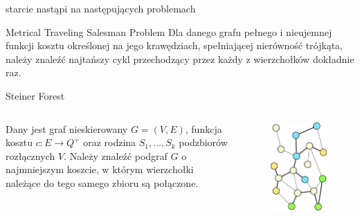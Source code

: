 \documentclass[final,hyperref={pdfpagelabels=false}]{beamer}
\begin{document}
\begin{frame}
  \begin{columns}		
    \begin{column}{.96\textwidth}
      \vspace{1cm}
      \begin{center}
        \veryHuge starcie nastąpi na następujących problemach
      \end{center}
      \vspace{1cm}

      \begin{block}{Metrical Traveling Salesman Problem}
        Dla danego grafu pełnego i nieujemnej funkcji kosztu określonej na jego krawędziach, spełniającej nierówność trójkąta, należy znaleźć najtańszy cykl przechodzący przez każdy z wierzchołków dokładnie raz.
      \end{block}

      \begin{block}{Steiner Forest}
        \begin{minipage}{.48\linewidth}

          \begin{columns}
            \begin{column}{.58\linewidth}
              Dany jest graf nieskierowany $G = (V, E)$, funkcja kosztu $c: E
              \rightarrow Q^+$ oraz rodzina $S_1, \hdots, S_k$ podzbiorów
              rozłącznych $V$. Należy znaleźć podgraf $G$ o najmniejszym
              koszcie, w którym wierzchołki należące do tego samego zbioru są
              połączone.
            \end{column}

            \begin{column}{.38\linewidth}
              \begin{figure}
                \centering
                \includegraphics[height=.96\linewidth]{sf_poster.eps}
              \end{figure}
            \end{column}
          \end{columns}


\end{minipage}
\end{block}
\end{column}
\end{columns}
\end{frame}
\end{document}
